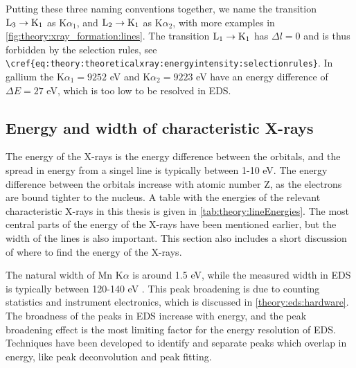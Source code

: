 Putting these three naming conventions together, we name the transition $\textnormal{L}_3 \rightarrow \textnormal{K}_1$ as K$\alpha_1$, and $\textnormal{L}_2 \rightarrow \textnormal{K}_1$ as K$\alpha_2$, with more examples in \cref{fig:theory:xray_formation:lines}.
The transition $\textnormal{L}_1 \rightarrow \textnormal{K}_1$ has $\Delta l = 0$ and is thus forbidden by the selection rules, see \verb|\cref{eq:theory:theoreticalxray:energyintensity:selectionrules}|.
In gallium the K$\alpha_1 = 9252$ eV and K$\alpha_2 = 9223$ eV \cite{thompson_x-ray_2004} have an energy difference of $\Delta E = 27$ eV, which is too low to be resolved in EDS.




\subsection{Energy and width of characteristic X-rays}
\label{theory:xray_formation:energy}


The energy of the X-rays is the energy difference between the orbitals, and the spread in energy from a singel line is typically between 1-10 eV.
The energy difference between the orbitals increase with atomic number Z, as the electrons are bound tighter to the nucleus.
A table with the energies of the relevant characteristic X-rays in this thesis is given in \cref{tab:theory:lineEnergies}.
The most central parts of the energy of the X-rays have been mentioned earlier, but the width of the lines is also important.
This section also includes a short discussion of where to find the energy of the X-rays.

The natural width of Mn K$\alpha$ is around 1.5 eV, while the measured width in EDS is typically between 120-140 eV \cite[Ch. 16.1.1]{goldstein_scanning_2018}.
This peak broadening is due to counting statistics and instrument electronics, which is discussed in \cref{theory:eds:hardware}.
The broadness of the peaks in EDS increase with energy, and the peak broadening effect is the most limiting factor for the energy resolution of EDS.
Techniques have been developed to identify and separate peaks which overlap in energy, like peak deconvolution and peak fitting.




